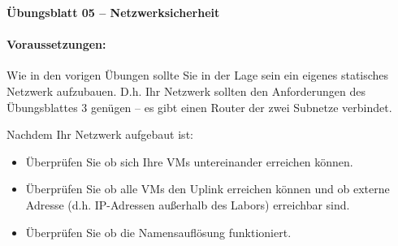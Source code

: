 \documentclass[paper=a4,fontsize=11pt]{scrartcl}%
\numberwithin{equation}{section}
\begin{document}
\begin{center}
\Large{\textbf{Übungsblatt 05 -- Netzwerksicherheit}}
\end{center}
\paragraph{Voraussetzungen:}
Wie in den vorigen Übungen sollte Sie in der Lage sein ein eigenes statisches Netzwerk aufzubauen. D.h. Ihr Netzwerk sollten den Anforderungen des Übungsblattes 3 genügen  -- es gibt einen Router der zwei Subnetze verbindet.

Nachdem Ihr Netzwerk aufgebaut ist:
\begin{itemize}
	\item Überprüfen Sie ob sich Ihre VMs untereinander erreichen können.
	\item Überprüfen Sie ob alle VMs den Uplink erreichen können und ob externe Adresse (d.h. IP-Adressen außerhalb des Labors) erreichbar sind.
	\item Überprüfen Sie ob die Namensauflösung funktioniert.
\end{itemize}
\end{document}
